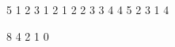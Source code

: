 
\begin{myverbbox}[\small]{\vinput}
5
1 2 3 1 2
1 2
2 3
3 4
4 5
2 3 1 4
\end{myverbbox}
\begin{myverbbox}[\small]{\voutput}
8 4 2 1 0
\end{myverbbox}


